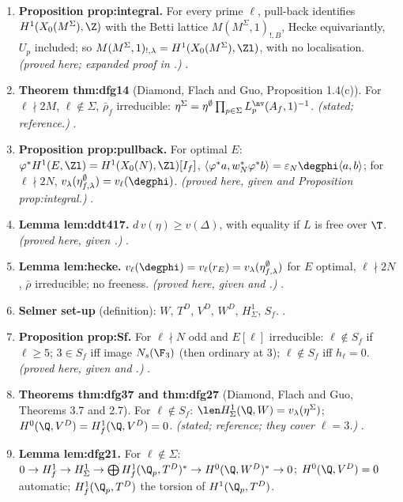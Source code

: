 \begin{sloppypar}
\begin{enumerate}[label=\textbf{\thechapter.\arabic*}]
\item \textbf{Proposition prop:integral.} For every prime $\ell$, pull-back identifies $H^1(X_0(M^\Sigma),\Z)$ with the Betti lattice $M(M^\Sigma,1)_{!,B}$, Hecke equivariantly, $U_p$ included; so
$M(M^\Sigma,1)_{!,\lambda}=H^1(X_0(M^\Sigma),\Zl)$, with no localisation. \emph{(proved here; expanded proof in .)} .
\item \textbf{Theorem thm:dfg14} (Diamond, Flach and Guo, Proposition 1.4(c)). For $\ell\nmid2M$, $\ell\notin\Sigma$, $\bar\rho_f$ irreducible: $\eta^\Sigma=\eta^\emptyset\prod_{p\in\Sigma}L^{\nv}_p(A_f,1)^{-1}$. \emph{(stated; reference.)}
.
\item \textbf{Proposition prop:pullback.} For optimal $E$: $\varphi^*H^1(E,\Zl)=H^1(X_0(N),\Zl)[I_f]$, $\langle\varphi^*a,w_N^*\varphi^*b\rangle=\varepsilon_N\degphi\langle a,b\rangle$; for $\ell\nmid2N$,
$v_\lambda(\eta^\emptyset_{f,\lambda})=v_\ell(\degphi)$. \emph{(proved here, given  and Proposition prop:integral.)} .
\item \textbf{Lemma lem:ddt417.} $d\,v(\eta)\ge v(\Delta)$, with equality if $L$ is free over $\T$. \emph{(proved here, given .)} .
\item \textbf{Lemma lem:hecke.} $v_\ell(\degphi)=v_\ell(r_E)=v_\lambda(\eta^\emptyset_{f,\lambda})$ for $E$ optimal, $\ell\nmid2N$, $\bar\rho$ irreducible; no freeness. \emph{(proved here, given \cite{ARS12} and
.)} .
\item \textbf{Selmer set-up} (definition): $W$, $T^D$, $V^D$, $W^D$, $H^1_\Sigma$, $S_f$. .
\item \textbf{Proposition prop:Sf.} For $\ell\nmid N$ odd and $E[\ell]$ irreducible: $\ell\notin S_f$ if $\ell\ge5$; $3\in S_f$ iff image $N_s(\F_3)$ (then ordinary at $3$); $\ell\notin S_f$ iff $h_\ell=0$.
\emph{(proved here, given \cite[Section 1]{Serre72} and .)} .
\item \textbf{Theorems thm:dfg37 and thm:dfg27} (Diamond, Flach and Guo, Theorems 3.7 and 2.7). For $\ell\notin S_f$: $\len H^1_\Sigma(\Q,W)=v_\lambda(\eta^\Sigma)$; $H^0(\Q,V^D)=H^1_f(\Q,V^D)=0$.
\emph{(stated; reference; they cover $\ell=3$.)} .
\item \textbf{Lemma lem:dfg21.} For $\ell\notin\Sigma$: $0\to H^1_f\to H^1_\Sigma\to\bigoplus H^1_f(\Q_p,T^D)^*\to H^0(\Q,W^D)^*\to0$; $H^0(\Q,V^D)=0$ automatic; $H^1_f(\Q_p,T^D)$ the torsion of $H^1(\Q_p,T^D)$.

\end{enumerate}
\end{sloppypar}
